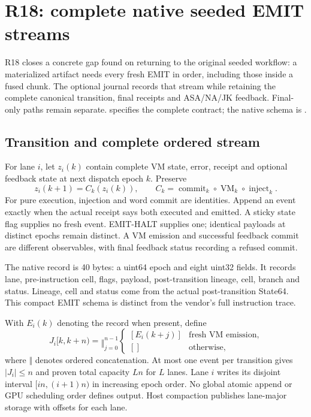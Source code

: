\section{R18: complete native seeded EMIT streams}
\label{sec:r18-journal}

R18 closes a concrete gap found on returning to the original seeded
workflow: a materialized artifact needs every fresh EMIT in order, including
those inside a fused chunk. The optional journal records that stream while
retaining the complete canonical transition, final receipts and ASA/NA/JK
feedback. Final-only paths remain separate.
 specifies the complete contract;
the native schema is .

\subsection{Transition and complete ordered stream}
For lane $i$, let $z_i(k)$ contain complete VM state, error, receipt and
optional feedback state at next dispatch epoch $k$. Preserve
\begin{equation}
 z_i(k+1)=C_k(z_i(k)),\qquad
 C_k=\operatorname{commit}_k\circ\operatorname{VM}_k
       \circ\operatorname{inject}_k.
\end{equation}
For pure execution, injection and word commit are identities. Append an
event exactly when the actual receipt says both executed and emitted.
A sticky state flag supplies no fresh event. EMIT-HALT supplies one;
identical payloads at distinct epochs remain distinct. A VM emission and
successful feedback commit are different observables, with final feedback
status recording a refused commit.

The native record is 40 bytes: a uint64 epoch and eight uint32 fields.
It records lane, pre-instruction cell, flags, payload, post-transition
lineage, cell, branch and status. Lineage, cell and status come from the
actual post-transition State64. This compact EMIT schema is distinct from
the vendor's full instruction trace.

With $E_i(k)$ denoting the record when present, define
\begin{equation}
 J_i[k,k+n)=\mathop{\Vert}_{j=0}^{n-1}
 \begin{cases}[E_i(k+j)]&\text{fresh VM emission},\\
 []&\text{otherwise},\end{cases}
 \label{eq:r18-stream}
\end{equation}
where $\Vert$ denotes ordered concatenation. At most one event per
transition gives $|J_i|\le n$ and proven total capacity $Ln$ for $L$ lanes.
Lane $i$ writes its disjoint interval $[in,(i+1)n)$ in increasing epoch
order. No global atomic append or GPU scheduling order defines output.
Host compaction publishes lane-major storage with offsets for each lane.

